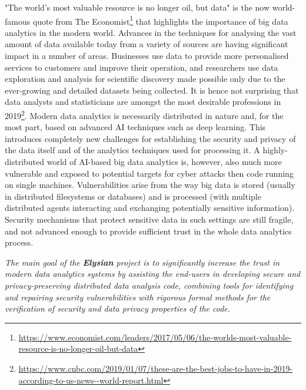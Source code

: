 \documentclass[a4paper,11pt]{article}
\newcommand{\project}[1]{\textbf{#1}\xspace}
\newcommand{\SECURITY}{\project{Elysian}}
\newcommand{\TheProject}{\SECURITY}
\begin{document}
"The world's most valuable resource is no longer oil, but data" is the now world-famous quote from The Economist\footnote{\url{https://www.economist.com/leaders/2017/05/06/the-worlds-most-valuable-resource-is-no-longer-oil-but-data}} that highlights the importance of big data analytics in the modern world. Advances in the techniques for analysing the vast amount of data available today from a variety of sources are having %
significant impact in a number of areas. Businesses use data to provide more personalised services to customers and improve their operation, and researchers use 
data exploration and analysis for scientific discovery made possible only due to %
the ever-growing and detailed datasets being collected. 
It is hence not surprising 
that data analysts and statisticians are amongst the most desirable professions in 2019\footnote{\url{https://www.cnbc.com/2019/01/07/these-are-the-best-jobs-to-have-in-2019-according-to-us-news--world-report.html}}. Modern data analytics is necessarily distributed in nature and, for the most part, based on advanced AI techniques such as deep learning.  This 
introduces
completely new challenges for establishing the security and privacy %
of the data itself and of the analytics techniques used for processing it. A highly-distributed world of AI-based big data analytics 
is, however, also much more vulnerable and exposed to
potential targets for cyber attacks then code running on single machines. Vulnerabilities arise %
from the way big data is stored (usually in distributed filesystems or databases) and is processed (with multiple distributed agents interacting and exchanging potentially sensitive information). Security mechanisms that protect sensitive data in such settings are still fragile, and not advanced enough to provide sufficient trust in the whole data analytics process. 

\begin{mdframed}[backgroundcolor=blue!5]
\emph{The main goal of the \TheProject{} project is to significantly increase the trust in modern data analytics systems by assisting the end-users in developing secure and privacy-preserving distributed data analysis code, combining tools for identifying and repairing security vulnerabilities with rigorous formal methods for the verification of security and data privacy properties of the code.}
\end{mdframed}
\end{document}
